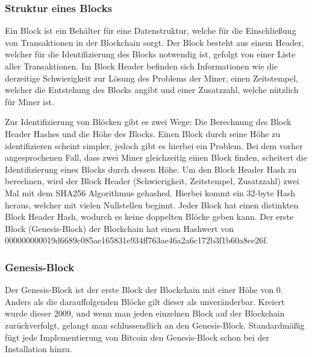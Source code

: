 \subsubsection{Struktur eines Blocks}
Ein Block ist ein Behälter für eine Datenstruktur, welche für die Einschließung von Transaktionen in der Blockchain sorgt. Der
Block besteht aus einem Header, welcher für die Identifizierung des Blocks notwendig ist, gefolgt von einer Liste aller 
Transaktionen. Im Block Header befinden sich Informationen wie die derzeitige Schwierigkeit zur Lösung des Problems der Miner,
einen Zeitstempel, welcher die Entstehung des Blocks angibt und einer Zusatzzahl, welche nützlich für Miner ist.

Zur Identifizierung von Blöcken gibt es zwei Wege: Die Berechnung des Block Header Hashes und die Höhe des Blocks. Einen Block 
durch seine Höhe zu identifizieren scheint simpler, jedoch gibt es hierbei ein Problem. Bei dem vorher angesprochenen Fall,
dass zwei Miner gleichzeitig einen Block finden, scheitert die Identifizierung eines Blocks durch dessen Höhe. Um den Block
Header Hash zu berechnen, wird der Block Header (Schwierigkeit, Zeitstempel, Zusatzzahl) zwei Mal mit dem SHA256 Algorithmus 
gehashed. Hierbei kommt ein 32-byte Hash heraus, welcher mit vielen Nullstellen beginnt. Jeder Block hat einen distinkten Block
Header Hash, wodurch es keine doppelten Blöcke geben kann. Der erste Block (Genesis-Block) der Blockchain hat einen Hashwert von
000000000019d6689c085ae165831e934ff763ae46a2a6c172b3f1b60a8ce26f. 

\subsubsection{Genesis-Block}
Der Genesis-Block ist der erste Block der Blockchain mit einer Höhe von 0. Anders als die darauffolgenden Blöcke gilt dieser als
unveränderbar. Kreiert wurde dieser 2009, und wenn man jeden einzelnen Block auf der Blockchain zurückverfolgt, gelangt man
schlussendlich an den Genesis-Block. Standardmäßig fügt jede Implementierung von Bitcoin den Genesis-Block schon bei der 
Installation hinzu.